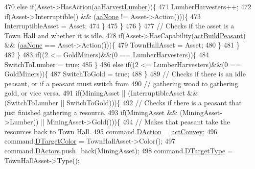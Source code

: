 \begin{DoxyCode}
470                 \textcolor{keywordflow}{else} \textcolor{keywordflow}{if}(Asset->HasAction(\hyperlink{GameDataTypes_8h_ab47668e651a3032cfb9c40ea2d60d670a4c44c3d83b3b67a8dd2248d11bedd0ee}{aaHarvestLumber}))\{
471                     LumberHarvesters++;
472                     \textcolor{keywordflow}{if}(Asset->Interruptible() && (\hyperlink{GameDataTypes_8h_ab47668e651a3032cfb9c40ea2d60d670ac17cc5a0035320c060d7f8074143b507}{aaNone} != Asset->Action()))\{
473                         InterruptibleAsset = Asset;
474                     \}
475                 \}
476             \}
477             \textcolor{comment}{// Checks if the asset is a Town Hall and whether it is idle.}
478             \textcolor{keywordflow}{if}(Asset->HasCapability(\hyperlink{GameDataTypes_8h_a35b98ce26aca678b03c6f9f76e4778cea66c601dce0fc095460b3c2c25f66ee71}{actBuildPeasant}) && (\hyperlink{GameDataTypes_8h_ab47668e651a3032cfb9c40ea2d60d670ac17cc5a0035320c060d7f8074143b507}{aaNone} == Asset->Action()))\{
479                 TownHallAsset = Asset;
480             \}
481         \}
482     \}
483     \textcolor{keywordflow}{if}((2 <= GoldMiners)&&(0 == LumberHarvesters))\{
484         SwitchToLumber = \textcolor{keyword}{true}; 
485     \}
486     \textcolor{keywordflow}{else} \textcolor{keywordflow}{if}((2 <= LumberHarvesters)&&(0 == GoldMiners))\{
487         SwitchToGold = \textcolor{keyword}{true}; 
488     \}
489     \textcolor{comment}{// Checks if there is an idle peasant, or if a peasant must switch from}
490     \textcolor{comment}{// gathering wood to gathering gold, or vice versa.}
491     \textcolor{keywordflow}{if}(MiningAsset || (InterruptibleAsset && (SwitchToLumber || SwitchToGold)))\{
492         \textcolor{comment}{// Checks if there is a peasant that just finished gathering a resource.}
493         \textcolor{keywordflow}{if}(MiningAsset && (MiningAsset->Lumber() || MiningAsset->Gold()))\{
494             \textcolor{comment}{// Makes that peasant take the resources back to Town Hall.}
495             command.\hyperlink{structSPlayerCommandRequest_a80897bbccf2c4e0b148a7aa815a926c6}{DAction} = \hyperlink{GameDataTypes_8h_a35b98ce26aca678b03c6f9f76e4778cead52ccba78becf1f7411bcea19f1276a8}{actConvey};
496             command.\hyperlink{structSPlayerCommandRequest_a3690a5117efe6214d92f18d672b5714f}{DTargetColor} = TownHallAsset->Color();
497             command.\hyperlink{structSPlayerCommandRequest_aa37fc01519676345703d78b9f573894a}{DActors}.push\_back(MiningAsset);
498             command.\hyperlink{structSPlayerCommandRequest_a864e47c641127665751091876a6d3c5e}{DTargetType} = TownHallAsset->Type();

\end{DoxyCode}
